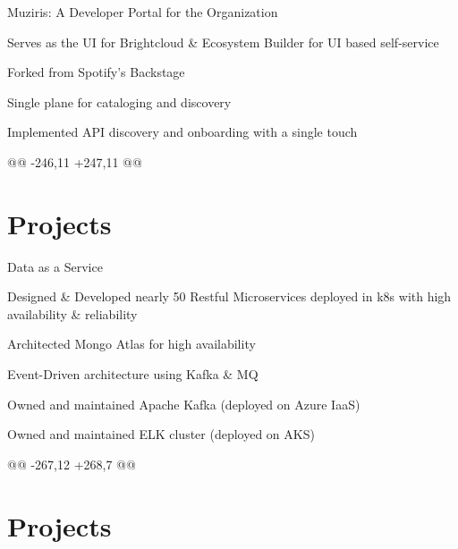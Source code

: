 \documentclass[]{de-resume}
\begin{document}
\begin{minipage}[t]{0.66\textwidth}
\begin{tightemize}
 \item Muziris: A Developer Portal for the Organization
 \begin{tightemize}
 	\sectionsep
 	\item Serves as the UI for Brightcloud \& Ecosystem Builder for UI based self-service
 	\item Forked from Spotify's Backstage
 	\item Single plane for cataloging and discovery 
 	\item Implemented API discovery and onboarding with a single touch
 	\sectionsep
 \end{tightemize}

    
        
          
    

        
    
    @@ -246,11 +247,11 @@ \section{Projects}
  
\end{tightemize}
\sectionsep
{}
\begin{tightemize}
 \item Data as a Service
 	\sectionsep
 	\begin{tightemize}
 	\item Designed \& Developed nearly 50 Restful Microservices deployed in k8s with high availability \& reliability
 	\item Architected Mongo Atlas for high availability 
 	\item Event-Driven architecture using Kafka \& MQ
 	\item Owned and maintained Apache Kafka (deployed on Azure IaaS)
 	\item Owned and maintained ELK cluster (deployed on AKS)
 	\end{tightemize}
 	\sectionsep
 \end{tightemize}

    
        
          
    

        
    
    @@ -267,12 +268,7 @@ \section{Projects}
  

\end{minipage}
\end{document}
